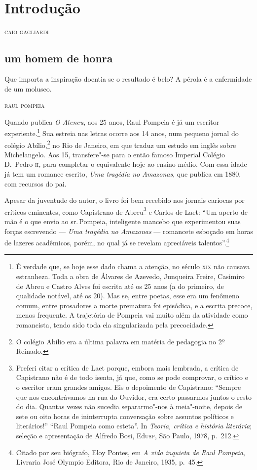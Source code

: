 \chapter[Introdução, \emph{por Caio Gagliardi}]{Introdução}

\begin{flushright}
\textsc{caio gagliardi}
\end{flushright}

\section*{um homem de honra}

\epigraph{Que importa a inspiração doentia se o resultado é belo? A pérola é a enfermidade de um molusco.}{\textsc{raul pompeia}}

Quando publica \textit{O
Ateneu}, aos 25 anos, Raul Pompeia é já um escritor
experiente.\footnote{ É verdade que, se hoje esse dado chama a
atenção, no século \textsc{xix} não causava estranheza. Toda a obra de Álvares
de Azevedo, Junqueira Freire, Casimiro de Abreu e Castro Alves foi
escrita até os 25 anos (a do primeiro, de qualidade notável, até os
20). Mas se, entre poetas, esse era um fenômeno comum, entre prosadores
a morte prematura foi episódica, e a escrita precoce, menos frequente.
A trajetória de Pompeia vai muito além da atividade como romancista,
tendo sido toda ela singularizada pela precocidade.}
Sua estreia nas letras ocorre aos 14 anos, num pequeno jornal do
colégio Abílio,\footnote{O colégio Abílio era a
última palavra em matéria de pedagogia no 2º Reinado.} no Rio de Janeiro, 
em que traduz um estudo em inglês sobre
Michelangelo. Aos 15, transfere"-se para o então famoso Imperial
Colégio D.~Pedro \textsc{ii}, para completar o equivalente hoje ao ensino médio.
Com essa idade já tem um romance escrito, \textit{Uma
tragédia no Amazonas}, que publica em 1880, com recursos do pai.


Apesar da juventude do autor, o livro foi bem recebido
nos jornais cariocas por críticos eminentes, como Capistrano de
Abreu\footnote{ Preferi citar a crítica de Laet porque, embora mais
lembrada, a crítica de Capistrano não é de todo isenta, já que, como se
pode comprovar, o crítico e o escritor eram grandes amigos. Eis o
depoimento de Capistrano: ``Sempre que nos encontrávamos na rua do
Ouvidor, era certo passarmos juntos o resto do dia. Quantas vezes não
sucedia separarmo"-nos à meia"-noite, depois de sete ou oito horas de
ininterrupta conversação sobre assuntos políticos e literários!'' ``Raul
Pompeia como esteta''. In \textit{Teoria, crítica e história literária};
seleção e apresentação de Alfredo Bosi, Ed\textsc{usp}, São Paulo, 1978, p.~212.}
e Carlos de Laet: ``Um aperto de mão é o que envio ao
sr.\,Pompeia, inteligente mancebo que experimentou suas forças
escrevendo --- \textit{Uma tragédia no
Amazonas} --- romancete esboçado em horas de lazeres
acadêmicos, porém, no qual já se revelam apreciáveis
talentos''.\footnote{ Citado por seu biógrafo, Eloy Pontes, em
\textit{A vida inquieta de Raul Pompeia}, Livraria José
Olympio Editora, Rio de Janeiro, 1935, p.~45.}


